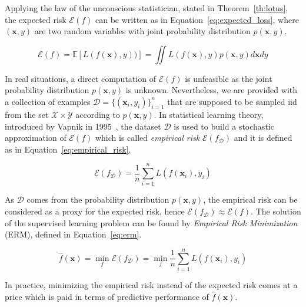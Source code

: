 Applying the law of the unconscious statistician, stated in Theorem~\ref{th:lotus}, the expected risk $\mathcal{E}(f)$ can be written as in Equation~\eqref{eq:expected_loss}, where $(\bm{x},y)$ are two random variables with joint probability distribution $p(\bm{x},y)$.

\begin{equation} \label{eq:expected_loss}
	\mathcal{E}(f) = \mathbb{E}[L(f(\bm{x}),y))] = \iint L(f(\bm{x}),y) p(\bm{x},y) d\bm{x}dy
\end{equation}

In real situations, a direct computation of $\mathcal{E}(f)$ is unfeasible as the joint probability distribution $p(\bm{x},y)$ is unknown. Nevertheless, we are provided with a collection of examples $\mathcal{D}=\{(\bm{x}_i,y_i)\}_{i=1}^n$ that are supposed to be sampled \ac{iid} from the set $\mathcal{X} \times \mathcal{Y}$ according to $p(\bm{x}, y)$.
In statistical learning theory, introduced by Vapnik in 1995~\cite{vapnik2013nature}, the dataset $\mathcal{D}$ is used to build a stochastic approximation of $\mathcal{E}(f)$ which is called \textit{empirical risk} $\mathcal{E}(f_{\mathcal{D}})$ and it is defined as in Equation~\eqref{eq:empirical_risk}.

\begin{equation} \label{eq:empirical_risk}
	\mathcal{E}(f_{\mathcal{D}}) = \frac{1}{n} \sum_{i=1}^{n} L(f(\bm{x}_i), y_i)
\end{equation}

As $\mathcal{D}$ comes from the probability distribution $p(\bm{x},y)$, the empirical risk can be considered as a proxy for the expected risk, hence $\mathcal{E}(f_{\mathcal{D}}) \approx \mathcal{E}(f)$. The solution of the supervised learning problem can be found by \textit{Empirical Risk Minimization} (ERM), defined in Equation~\eqref{eq:erm}.

\begin{equation} \label{eq:erm}
	\hat f(\bm{x}) = \min_f{\mathcal{E}(f_{\mathcal{D}})} = \min_f{\frac{1}{n} \sum_{i=1}^{n} L(f(\bm{x}_i), y_i)}
\end{equation}

In practice, minimizing the empirical risk instead of the expected risk comes at a price which is paid in terms of predictive performance of $\hat f(\bm{x})$. 

 

